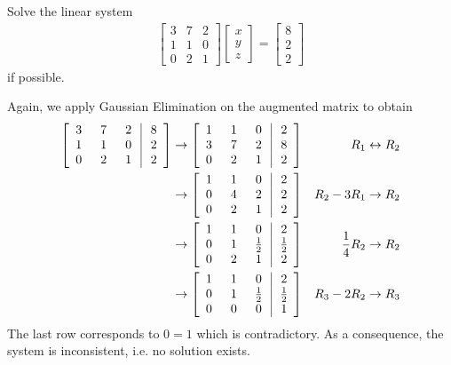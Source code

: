 \begin{exmp}
\label{exmp:nosol}
Solve the linear system
\begin{align*}
\begin{bmatrix}
3 & 7 & 2 \\
1 & 1 & 0 \\
0 & 2 & 1 
\end{bmatrix}
\begin{bmatrix}
x \\
y \\
z
\end{bmatrix}
=
\begin{bmatrix}
8 \\
2 \\
2
\end{bmatrix}   
\end{align*}
if possible.
\end{exmp}
\begin{solution} Again, we apply Gaussian Elimination on the augmented matrix to obtain
\begin{align*}
\left[\begin{array}{@{\;}wc{10pt}wc{10pt}wc{10pt}|wc{10pt}@{\;}}
3 & 7 & 2 & 8 \\
1 & 1 & 0 & 2 \\
0 & 2 & 1 & 2
\end{array}\right] 
& \to 
\left[\begin{array}{@{\;}wc{10pt}wc{10pt}wc{10pt}|wc{10pt}@{\;}}
1 & 1 & 0 & 2 \\
3 & 7 & 2 & 8 \\
0 & 2 & 1 & 2
\end{array}\right] 
& R_1 \leftrightarrow R_2 \\
& \to 
\left[\begin{array}{@{\;}wc{10pt}wc{10pt}wc{10pt}|wc{10pt}@{\;}}
1 & 1 & 0 & 2 \\
0 & 4 & 2 & 2 \\
0 & 2 & 1 & 2
\end{array}\right] 
& R_2-3R_1 \to R_2 \\
& \to 
\left[\begin{array}{@{\;}wc{10pt}wc{10pt}wc{10pt}|wc{10pt}@{\;}}
1 & 1 & 0 & 2 \\
0 & 1 & \frac{1}{2} & \frac{1}{2} \\
0 & 2 & 1 & 2
\end{array}\right] 
& \frac{1}{4}R_2 \to R_2 \\
& \to 
\left[\begin{array}{@{\;}wc{10pt}wc{10pt}wc{10pt}|wc{10pt}@{\;}}
1 & 1 & 0 & 2 \\
0 & 1 & \frac{1}{2} & \frac{1}{2} \\
0 & 0 & 0 & 1
\end{array}\right] 
& R_3 - 2R_2 \to R_3
\end{align*}
The last row corresponds to $0 = 1$ which is contradictory. As a consequence, the system is inconsistent, i.e. no solution exists.
\end{solution}

